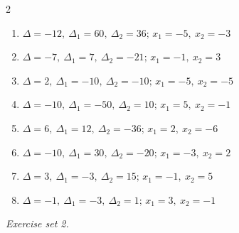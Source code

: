 \begin{multicols}{2}
\begin{enumerate}[label=\arabic*., leftmargin=*, itemsep=1pt]
\item $\Delta=-12,\ \Delta_1=60,\ \Delta_2=36;\,x_1=-5,\ x_2=-3$
\item $\Delta=-7,\ \Delta_1=7,\ \Delta_2=-21;\,x_1=-1,\ x_2=3$
\item $\Delta=2,\ \Delta_1=-10,\ \Delta_2=-10;\,x_1=-5,\ x_2=-5$
\item $\Delta=-10,\ \Delta_1=-50,\ \Delta_2=10;\,x_1=5,\ x_2=-1$
\item $\Delta=6,\ \Delta_1=12,\ \Delta_2=-36;\,x_1=2,\ x_2=-6$
\item $\Delta=-10,\ \Delta_1=30,\ \Delta_2=-20;\,x_1=-3,\ x_2=2$
\item $\Delta=3,\ \Delta_1=-3,\ \Delta_2=15;\,x_1=-1,\ x_2=5$
\item $\Delta=-1,\ \Delta_1=-3,\ \Delta_2=1;\,x_1=3,\ x_2=-1$
\end{enumerate}
\end{multicols}
\par\noindent\emph{Exercise set 2.}\nopagebreak
